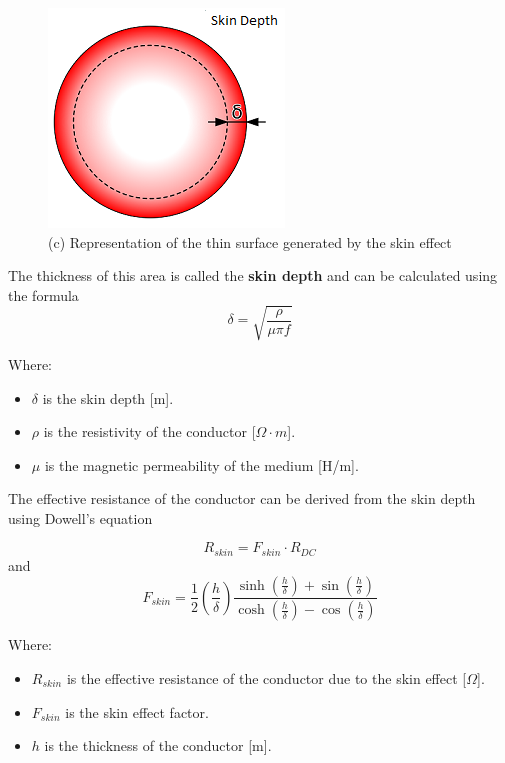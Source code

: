 \begin{itemize}
    \begin{figure}[th]
        \centering
        \includegraphics[scale=0.4]{Chapters/Chapter2/Flexible_PCB_coils/Figures/skin_depth.png} %
        \caption[Skin depth]{(c) Representation of the thin surface generated by the skin effect}
        \label{fig: Skin depth}
    \end{figure}

    The thickness of this area is called the \textbf{skin depth} and can be calculated using the formula
    \begin{equation}
        \delta = \sqrt{\frac{\rho}{\mu \pi f}}
    \end{equation}
            
    Where:
    \begin{itemize}
        \item \( \delta \) is the skin depth [m].
        \item \( \rho \) is the resistivity of the conductor [\(\Omega \cdot m\)].
        \item \( \mu \) is the magnetic permeability of the medium [H/m].
    \end{itemize}
    
    The effective resistance of the conductor can be derived from the skin depth using Dowell's equation

    \begin{equation}
        R_{skin} = F_{skin} \cdot R_{DC}
    \end{equation}
    and
    \begin{equation}
        F_{skin} = \frac{1}{2} (\frac{h}{\delta}) \frac{\sinh(\frac{h}{\delta}) + \sin(\frac{h}{\delta})}{\cosh(\frac{h}{\delta}) - \cos(\frac{h}{\delta})}
    \end{equation}

    Where:
    \begin{itemize}
        \item \( R_{skin} \) is the effective resistance of the conductor due to the skin effect [\(\Omega\)].
        \item \( F_{skin} \) is the skin effect factor.
        \item \( h \) is the thickness of the conductor [m].
    \end{itemize}


\end{itemize}
